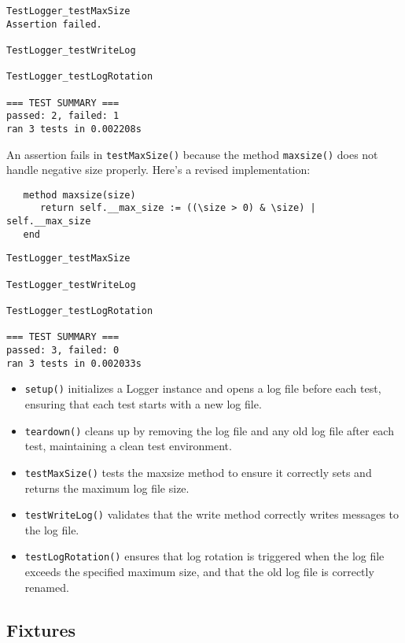 \documentclass[letterpaper,12pt]{article}
\begin{document}
\bigskip{}
\begin{verbatim}
TestLogger_testMaxSize
Assertion failed.

TestLogger_testWriteLog

TestLogger_testLogRotation

=== TEST SUMMARY ===
passed: 2, failed: 1
ran 3 tests in 0.002208s
\end{verbatim}

\bigskip\noindent An assertion fails in \texttt{testMaxSize()} because the method \texttt{maxsize()} does not handle negative size properly. Here's a revised implementation:

\bigskip{}
\begin{verbatim}
   method maxsize(size)
      return self.__max_size := ((\size > 0) & \size) | self.__max_size
   end
\end{verbatim}

\bigskip{}
\begin{verbatim}
TestLogger_testMaxSize

TestLogger_testWriteLog

TestLogger_testLogRotation

=== TEST SUMMARY ===
passed: 3, failed: 0
ran 3 tests in 0.002033s
\end{verbatim}

\begin{itemize}
   \item \texttt{setup()} initializes a Logger instance and opens a log file before each test, ensuring that each test starts with a new log file.
   \item \texttt{teardown()} cleans up by removing the log file and any old log file after each test, maintaining a clean test environment.
   \item \texttt{testMaxSize()} tests the maxsize method to ensure it correctly sets and returns the maximum log file size.
   \item \texttt{testWriteLog()} validates that the write method correctly writes messages to the log file.
   \item \texttt{testLogRotation()} ensures that log rotation is triggered when the log file exceeds the specified maximum size, and that the old log file is correctly renamed.
\end{itemize}

\newpage\subsection{Fixtures}
\end{document}
